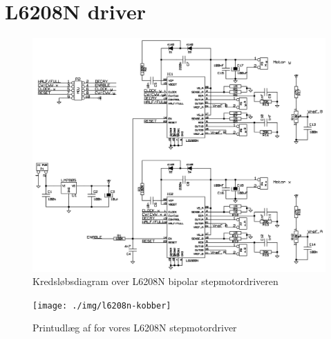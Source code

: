 \chapter{L6208N driver}
\label{b-l6208n}

\begin{figure}[htbp]
  \centering
  \includegraphics[width=\textwidth]{./img/l6208n-driver-diagram}
  \caption{Kredsløbsdiagram over L6208N bipolar stepmotordriveren}
  \label{fig:l6208n-diagram}
\end{figure}

\begin{figure}[htbp]
  \centering
  \texttt{[image: ./img/l6208n-kobber]}
  \caption{Printudlæg af for vores L6208N stepmotordriver}
  \label{fig:l6208n-print}
\end{figure}